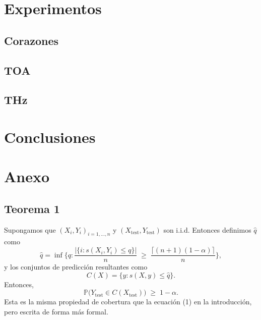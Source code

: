 \documentclass[12pt]{report}
\numberwithin{equation}{section}
\numberwithin{figure}{section}
\numberwithin{table}{section}
\theoremstyle{definition}
\begin{document}
\begin{flushleft}
\chapter{Experimentos}

\section{Corazones}



\section{TOA}


\section{THz}






\chapter{Conclusiones}

\appendix
\chapter{Anexo}

\section{Teorema 1}
\label{anexo:teorema1}

Supongamos que $(X_i, Y_i)_{i=1,\dots,n}$ y $(X_\text{test}, Y_\text{test})$ son i.i.d. Entonces definimos $\hat{q}$ como
\begin{equation*}
\hat{q} = \inf \Bigg\{ q : \frac{\left| \{i : s(X_i, Y_i) \leq q\} \right|}{n} \;\ge\; \frac{\lceil (n + 1)(1 - \alpha)\rceil}{n} \Bigg\},
\end{equation*}
y los conjuntos de predicción resultantes como
\begin{equation*}
C(X) = \{y : s(X, y) \leq \hat{q}\}.
\end{equation*}
Entonces,
\begin{equation*}
\mathbb{P}\big(Y_\text{test} \in C(X_\text{test})\big) \;\ge\; 1 - \alpha.
\end{equation*}
Esta es la misma propiedad de cobertura que la ecuación (1) en la introducción, pero escrita de forma más formal.


\end{flushleft}
\end{document}
